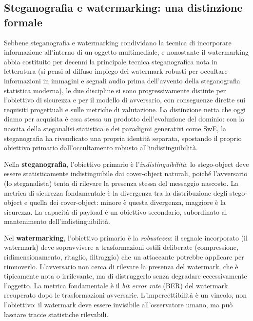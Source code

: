 \subsection{Steganografia e watermarking: una distinzione formale}\label{sec:stego-vs-watermark}

Sebbene steganografia e watermarking condividano la tecnica di incorporare informazione all'interno di un oggetto multimediale, e nonostante il watermarking abbia costituito per decenni la principale tecnica steganografica nota in letteratura (si pensi al diffuso impiego dei watermark robusti per occultare informazioni in immagini e segnali audio prima dell'avvento della steganografia statistica moderna), le due discipline si sono progressivamente distinte per l'obiettivo di sicurezza e per il modello di avversario, con conseguenze dirette sui requisiti progettuali e sulle metriche di valutazione. La distinzione netta che oggi diamo per acquisita è essa stessa un prodotto dell'evoluzione del dominio: con la nascita della steganalisi statistica e dei paradigmi generativi come SwE, la steganografia ha rivendicato una propria identità separata, spostando il proprio obiettivo primario dall'occultamento robusto all'indistinguibilità.

Nella \textbf{steganografia}, l'obiettivo primario è l'\emph{indistinguibilità}: lo stego-object deve essere statisticamente indistinguibile dai cover-object naturali, poiché l'avversario (lo steganalista) tenta di rilevare la presenza stessa del messaggio nascosto. La metrica di sicurezza fondamentale è la divergenza tra la distribuzione degli stego-object e quella dei cover-object: minore è questa divergenza, maggiore è la sicurezza. La capacità di payload è un obiettivo secondario, subordinato al mantenimento dell'indistinguibilità.

Nel \textbf{watermarking}, l'obiettivo primario è la \emph{robustezza}: il segnale incorporato (il watermark) deve sopravvivere a trasformazioni ostili deliberate (compressione, ridimensionamento, ritaglio, filtraggio) che un attaccante potrebbe applicare per rimuoverlo. L'avversario non cerca di rilevare la presenza del watermark, che è tipicamente nota o irrilevante, ma di distruggerlo senza degradare eccessivamente l'oggetto. La metrica fondamentale è il \emph{bit error rate} (BER) del watermark recuperato dopo le trasformazioni avversarie. L'impercettibilità è un vincolo, non l'obiettivo: il watermark deve essere invisibile all'osservatore umano, ma può lasciare tracce statistiche rilevabili.

